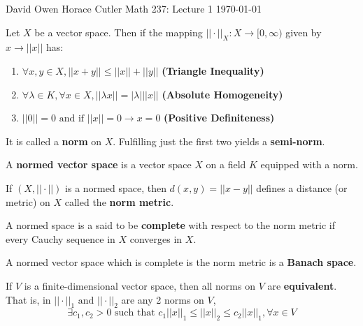 \documentclass[12pt]{article}
\newenvironment{theorem}[2][Theorem]{\begin{trivlist}
\item[\hskip \labelsep {\bfseries #1}\hskip \labelsep {\bfseries #2.}]}{\end{trivlist}}
\newenvironment{definition}[2][Definition]{\begin{trivlist}
\item[\hskip \labelsep {\bfseries #1}\hskip \labelsep {\bfseries #2.}]}{\end{trivlist}}
\begin{document}
\noindent David Owen Horace Cutler \hfill {\Large Math 237: Lecture 1} \hfill \today

\begin{definition}{(Semi-Norm and Norm)}
    Let $X$ be a vector space. Then if the mapping $||\cdot||_{X} : X \rightarrow [0,\infty)$ given by $x \rightarrow ||x||$ has:
        \begin{enumerate}
            \item $\forall x, y \in X, ||x + y|| \leq ||x|| + ||y||$ \textbf{(Triangle Inequality)}
            \item $\forall \lambda \in K, \forall x \in X, ||\lambda x|| = |\lambda|||x||$ \textbf{(Absolute Homogeneity)}
            \item $||0|| = 0 \text{ and if } ||x|| =0 \rightarrow x = 0$ \textbf{(Positive Definiteness)}
        \end{enumerate}
    It is called a \textbf{norm} on $X$. Fulfilling just the first two yields a \textbf{semi-norm}.
\end{definition}

\begin{definition}{(Normed Vector Space)}
    A \textbf{normed vector space} is a vector space $X$ on a field $K$ equipped with a norm.
\end{definition}

\begin{definition}{(Metric Norm)}
    If $(X, ||\cdot||)$ is a normed space, then $d(x,y) = ||x - y||$ defines a distance (or metric) on $X$ called the \textbf{norm metric}.
\end{definition}

\begin{definition}{(Completeness in Norm Metric)}
    A normed space is a said to be \textbf{complete} with respect to the norm metric if every Cauchy sequence in $X$ converges in $X$. 
\end{definition}

\begin{definition}{(Banach Space)}
    A normed vector space which is complete is the norm metric is a \textbf{Banach space}.
\end{definition}

\begin{theorem}{(Norm Equivalence on Finite-Dimensional Normed Vector Spaces)}
    If $V$ is a finite-dimensional vector space, then all norms on $V$ are \textbf{equivalent}. That is, in $||\cdot||_1 \text{ and } ||\cdot||_2$ are any 2 norms on $V$, $$\exists c_1, c_2 > 0 \text{ such that } c_1||x||_1 \leq ||x||_2 \leq c_2||x||_1, \forall x \in V$$ 
\end{theorem}
\end{document}
